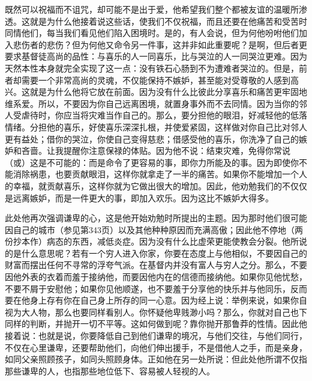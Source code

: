 \par

既然可以祝福而不诅咒，却可能不是出于爱，他希望我们整个都被友谊的温暖所渗透。这就是为什么他接着说这些话，使我们不仅祝福，而且还要在他痛苦和受苦时同情他们，每当我们看见他们陷入困境时。是的，有人会说，但为何他吩咐他们加入悲伤者的悲伤？但为何他又命令另一件事，这并非如此重要呢？是啊，但后者更要求基督徒高尚的品性：与喜乐的人一同喜乐，比与哭泣的人一同哭泣更难。因为天然本性本身就完全实现了这一点：没有铁石心肠到不为遭难者哭泣的。但是，前者却需要一个非常高尚的灵魂，不仅能保持不嫉妒，甚至能对受尊敬的人感到高兴。这就是为什么他将它放在前面。因为没有什么比彼此分享喜乐和痛苦更牢固地维系爱。所以，不要因为你自己远离困境，就置身事外而不去同情。因为当你的邻人受虐待时，你应当将灾难当作自己的。那么，要分担他的眼泪，好减轻他的低落情绪。分担他的喜乐，好使喜乐深深扎根，并使爱紧固，这样做对你自己比对邻人更有益处；借你的哭泣，你使自己变得慈悲；借感受他的喜乐，你洗净了自己的嫉妒和吝啬。让我提醒你注意保禄的体贴。因为他不说：结束灾难，免得你常说（或）这是不可能的：而是命令了更容易的事，即你力所能及的事。因为即使你不能消除祸患，也要贡献眼泪，这样你就拿走了一半的痛苦。如果你不能增加一个人的幸福，就贡献喜乐，这样你就为它做出很大的增加。因此，他劝勉我们的不仅仅是远离嫉妒，而是一件更大的事，即加入欢乐。因为这比不嫉妒大得多。\par

\par

此处他再次强调谦卑的心，这是他开始劝勉时所提出的主题。因为那时他们很可能因自己的城市（参见第343页）以及其他种种原因而充满高傲；因此他不停地（两份抄本作）病态的东西，减低炎症。因为没有什么比虚荣更能使教会分裂。他所说的是什么意思呢？若有一个穷人进入你家，你要在态度上与他相似，不要因自己的财富而摆出任何不寻常的浮夸气派。在基督内并没有富人与穷人之分。那么，不要因他外表的衣着而羞于接纳他，而要因他内在的信德而接纳他。如果你见他忧愁，不要不屑于安慰他；如果你见他顺遂，也不要羞于分享他的快乐并与他同乐，反而要在他身上存有你在自己身上所存的同一心意。因为经上说：举例来说，如果你自视为大人物，那么也要同样看别人。你怀疑他卑贱渺小吗？那么，你就对自己也下同样的判断，并抛开一切不平等。这如何做到呢？靠你抛开那鲁莽的性情。因此他接着说：也就是说，你要降低自己到他们谦卑的境况，与他们交往，与他们同行，不仅在心里谦卑，还要帮助他们，向他们伸出援手，不是借他人之手，而是亲身，如同父亲照顾孩子，如同头照顾身体。正如他在另一处所说：但此处他所谓不仅指那些谦卑的人，也指那些地位低下、容易被人轻视的人。\par


